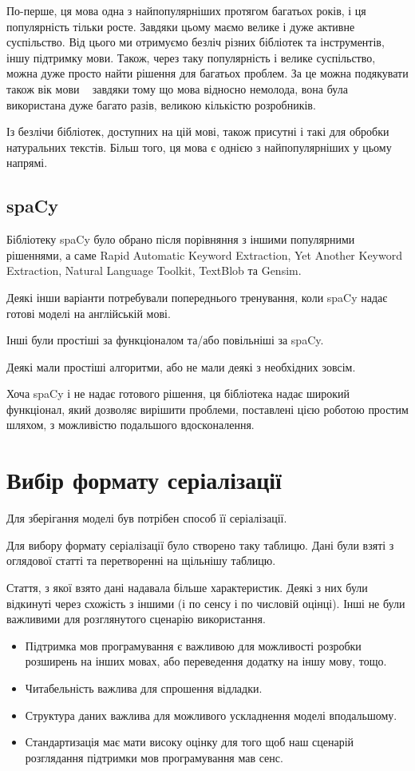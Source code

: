 \documentclass{article}
\let\oldsection\section
\renewcommand{\section}{\clearpage\oldsection}
\begin{document}
По-перше, ця мова одна з найпопулярніших протягом багатьох років,
і ця популярність тільки росте.
Завдяки цьому маємо велике і дуже активне суспільство.
Від цього ми отримуємо безліч різних бібліотек та інструментів, іншу підтримку мови.
Також, через таку популярність і велике суспільство,
можна дуже просто найти рішення для багатьох проблем.
За це можна подякувати також вік мови \textemdash~
завдяки тому що мова відносно немолода, вона була використана дуже багато разів,
великою кількістю розробників.

Із безлічи бібліотек, доступних на цій мові, також присутні
і такі для обробки натуральних текстів. Більш того, ця мова є однією з
найпопулярніших у цьому напрямі.

\subsection{spaCy}

Бібліотеку spaCy було обрано після порівняння з іншими популярними рішеннями,
а саме Rapid Automatic Keyword Extraction, Yet Another Keyword Extraction,
Natural Language Toolkit, TextBlob та Gensim.

Деякі інши варіанти потребували попереднього тренування, коли spaCy надає
готові моделі на англійській мові.

Інші були простіші за функціоналом та/або повільніші за spaCy.

Деякі мали простіші алгоритми, або не мали деякі з необхідних зовсім.

Хоча spaCy і не надає готового рішення,
ця бібліотека надає широкий функціонал, який дозволяє вирішити проблеми,
поставлені цією роботою простим шляхом, з можливістю подальшого вдосконалення.

\section{Вибір формату серіалізації}
Для зберігання моделі був потрібен способ її серіалізації.

Для вибору формату серіалізації було створено таку таблицю.
Дані були взяті з оглядової статті та перетворенні на щільнішу таблицю.

Стаття, з якої взято дані надавала більше характеристик.
Деякі з них були відкинуті через схожість з іншими (і по сенсу і по числовій оцінці).
Інші не були важливими для розглянутого сценарію використання.

\begin{itemize}
\item Підтримка мов програмування є важливою для можливості розробки розширень
  на інших мовах, або переведення додатку на іншу мову, тощо.
\item Читабельність важлива для спрошення відладки.
\item Структура даних важлива для можливого ускладнення моделі вподальшому.
\item Стандартизація має мати високу оцінку для того щоб наш сценарій
  розглядання підтримки мов програмування мав сенс.
\end{itemize}
\end{document}
